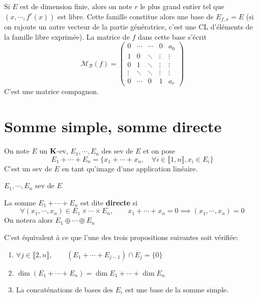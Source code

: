 Si $E$ est de dimension finie, alors on note  $r$ le plus grand entier tel que  $(x, \cdots , f^{r}(x))$ est libre. Cette famille constitue alors une base de $E_{f,x}=E$ (si on rajoute un autre vecteur de la partie génératrice, c'est une CL d'éléments de la famille libre exprimée). La matrice de $f$ dans cette base s'écrit  \[
    \mathcal  M_{\mathcal  B}(f)= \begin{pmatrix}
        0 & \cdots & \cdots & 0 & a_0 \\
        1 & 0 & \ddots & \vdots & \vdots \\
        0 & 1 & \ddots & \vdots & \vdots \\
        \vdots & \ddots & \ddots & \vdots & \vdots \\
        0 & \cdots & 0 & 1 & a_r
    \end{pmatrix}
\]
C'est une matrice compagnon.

\section{Somme simple, somme directe}

On note $E$ un $\mathbf K$-ev, $E_1,\cdots ,E_n$ des sev de $E$ et on pose  \[
    E_1+\cdots +E_n= \{x_1+\cdots +x_n, \quad \forall  i \in  \llbracket 1,n \rrbracket , x_i \in  E_i\}
\]
C'est un sev de $E$ en tant qu'image d'une application linéaire.

\begin{thmdef}
    \Hyp $E_1,\cdots ,E_n$ sev de $E$
    \begin{concenum}
    \item La somme $E_1+\cdots +E_n$ est dite \textbf{directe} si \[
            \forall  (x_1,\cdots ,x_n) \in  E_1\times \cdots \times E_n, \qquad  x_1+\cdots +x_n =0 \implies (x_1, \cdots , x_n)=0
        \]
        On notera alors $E_1\oplus \cdots \oplus E_n$
    \item C'est équivalent à ce que l'une des trois propositions suivantes soit vérifiée: \begin{enumerate}
        \item $\forall  j \in  \llbracket 2, n \rrbracket , \qquad  (E_1+\cdots+E_{j-1})\cap E_j= \{0\} $
        \item $\dim(E_1+\cdots +E_n)=\dim E_1+\cdots +\dim E_n$
        \item La concaténations de bases des $E_i$ est une base de la somme simple.
    \end{enumerate}
\end{concenum}
\end{thmdef}

